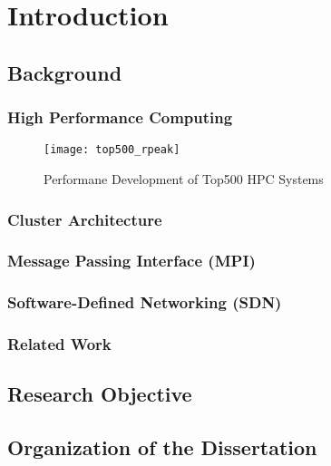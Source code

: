 \chapter{Introduction}

\section{Background}

\subsection{High Performance Computing}

\begin{figure}
    \centering
    \texttt{[image: top500\_rpeak]}
    \caption{Performane Development of Top500 HPC Systems}%
    \label{fig:top500-rpeak}
\end{figure}

\subsection{Cluster Architecture}

\subsection{Message Passing Interface (MPI)}

\subsection{Software-Defined Networking (SDN)}

\subsection{Related Work}

\section{Research Objective}

\section{Organization of the Dissertation}
